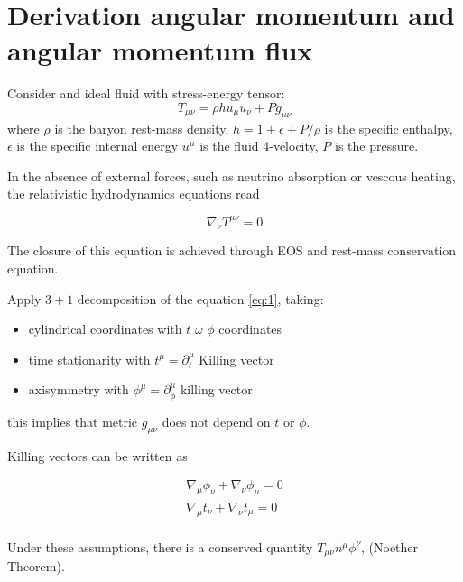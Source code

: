
\chapter{Derivation angular momentum and angular momentum flux}
\label{app:ang}

Consider and ideal fluid with stress-energy tensor:
\begin{equation}
T_{\mu\nu} = \rho h u_{\mu} u_{\nu} + Pg_{\mu\nu}
\end{equation}
where $\rho$ is the baryon rest-mass density, $h=1+\epsilon + P/\rho$ is the specific enthalpy, $\epsilon$ is the specific internal energy $u^{\mu}$ is the fluid 4-velocity, $P$ is the pressure. 

In the absence of external forces, such as neutrino absorption or vescous heating, the relativistic hydrodynamics equations read

\begin{equation}
\label{eq:1}
\nabla_{\nu}T^{\mu\nu} = 0
\end{equation}

The closure of this equation is achieved through EOS and rest-mass conservation equation. 

Apply $3+1$ decomposition of the equation \ref{eq:1}, taking:

\begin{itemize}
    \item cylindrical coordinates with $t$ $\omega$ $\phi$ coordinates
    \item time stationarity with $t^{\mu} = \partial_t ^{\mu}$ Killing vector
    \item axisymmetry with $\phi^{\mu} = \partial_{\phi} ^{\mu}$ killing vector
\end{itemize}

this implies that metric $g_{\mu\nu}$ does not depend on $t$ or $\phi$. 

Killing vectors can be written as 

\begin{eqnarray}
\nabla_{\mu}\phi_{\nu} + \nabla_{\nu}\phi_{\mu} = 0\\
\nabla_{\mu}t_{\nu} + \nabla_{\nu}t_{\mu} = 0\\
\end{eqnarray}

Under these assumptions, there is a conserved quantity $T_{\mu\nu}n^{\mu}\phi^{\nu}$, (Noether Theorem). 

